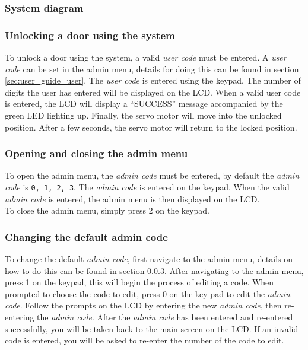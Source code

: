 \subsubsection{System diagram}
\subsubsection{Unlocking a door using the system}
  To unlock a door using the system, a valid \textit{user code} must be entered.
  A \textit{user code} can be set in the admin menu, details for doing this can be found in section \ref{sec:user_guide_user}.
  The \textit{user code} is entered using the keypad.
  The number of digits the user has entered will be displayed on the LCD.
  When a valid user code is entered, the LCD will display a ``SUCCESS'' message accompanied by the green LED lighting up.
  Finally, the servo motor will move into the unlocked position.
  After a few seconds, the servo motor will return to the locked position.

\subsubsection{Opening and closing the admin menu}\label{sec:user_guide_admin}
  To open the admin menu, the \textit{admin code} must be entered, by default the \textit{admin code} is \verb|0, 1, 2, 3|.
  The \textit{admin code} is entered on the keypad.
  When the valid \textit{admin code} is entered, the admin menu is then displayed on the LCD.\\

  To close the admin menu, simply press 2 on the keypad.

\subsubsection{Changing the default admin code}
  To change the default \textit{admin code}, first navigate to the admin menu, details on how to do this can be found in section \ref{sec:user_guide_admin}.
  After navigating to the admin menu, press 1 on the keypad, this will begin the process of editing a code.
  When prompted to choose the code to edit, press 0 on the key pad to edit the \textit{admin code}.
  Follow the prompts on the LCD by entering the new \textit{admin code}, then re-entering the \textit{admin code}.
  After the \textit{admin code} has been entered and re-entered successfully, you will be taken back to the main screen on the LCD.
  If an invalid code is entered, you will be asked to re-enter the number of the code to edit.

